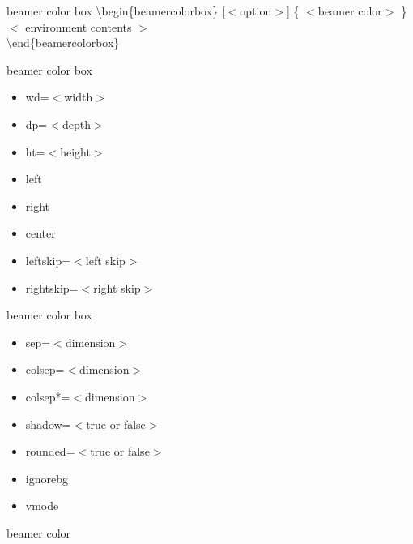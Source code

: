 \documentclass[10pt,blue,xcolor=pdftex,dvipsnames,table,handout]{beamer}
\begin{document}

		\begin{frame}[plain]
		\end{frame}


		\begin{frame}[allowframebreaks]

		\null
		\begin{block} {beamer color box}
			\textbackslash begin\{beamercolorbox\} [$<$option$>$] \{ $<$beamer color$>$ \}\\
			$<$ environment contents $>$ \\
			\textbackslash end\{beamercolorbox\}
		\end{block}

		\newpage \null
		\begin{block} {beamer color box}
			\begin{itemize}	
			\item	wd=$<$width$>$
			\item	dp=$<$depth$>$
			\item	ht=$<$height$>$
			\item	left
			\item	right
			\item	center
			\item	leftskip=$<$left skip$>$
			\item	rightskip=$<$right skip$>$
			\end{itemize}
		\end{block}

		\newpage \null
		\begin{block} {beamer color box}
			\begin{itemize}	
			\item	sep=$<$dimension$>$
			\item	colsep=$<$dimension$>$
			\item	colsep*=$<$dimension$>$
			\item	shadow=$<$true or false$>$
			\item	rounded=$<$true or false$>$
			\item	ignorebg
			\item	vmode
			\end{itemize}
		\end{block}



		\newpage
		\begin{beamercolorbox}{beamer color}
		\end{beamercolorbox}
		\end{frame}
\end{document}
